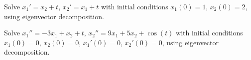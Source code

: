 \documentclass[12pt]{book}
\begin{document}
\begin{exercise}
Solve
$x_1' = x_2 + t$, $x_2' = x_1 +t$ with initial conditions
$x_1(0) = 1$, $x_2(0) = 2$,
using eigenvector decomposition.
\end{exercise}

\begin{exercise}
Solve
$x_1'' = -3x_1 + x_2 + t$, $x_2'' = 9x_1 + 5x_2
+\cos(t)$ with initial conditions
$x_1(0) = 0$, $x_2(0) = 0$,
$x_1'(0) = 0$, $x_2'(0) = 0$,
using eigenvector decomposition.
\end{exercise}
\end{document}
